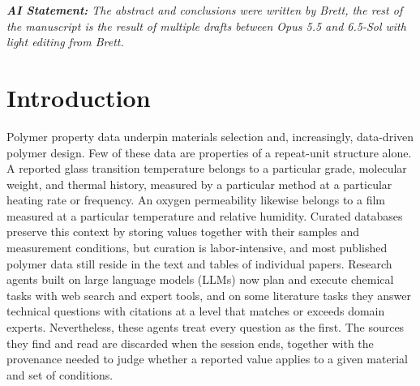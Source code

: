 \documentclass[journal=mamobx,manuscript=article]{achemso}
\begin{document}

{\small\itshape\noindent\textbf{AI Statement:} The abstract and conclusions were written by Brett, the rest of the manuscript is the result of multiple drafts between Opus 5.5 and 6.5-Sol with light editing from Brett.\par}

\section{Introduction}

Polymer property data underpin materials selection and, increasingly, data-driven polymer design.\cite{Audus2017Polymer,Chen2021Polymer}
Few of these data are properties of a repeat-unit structure alone.\cite{Jha2019Uncertainty,Liu2023Ontology}
A reported glass transition temperature belongs to a particular grade, molecular weight, and thermal history, measured by a particular method at a particular heating rate or frequency.\cite{FoxFlory1950Second,Hutchinson2009Glass,Jha2019Uncertainty}
An oxygen permeability likewise belongs to a film measured at a particular temperature and relative humidity.\cite{Muramatsu2003Oxygen,Mokwena2012EVOH}
Curated databases preserve this context by storing values together with their samples and measurement conditions,\cite{Otsuka2011PoLyInfo,Liu2023Ontology} but curation is labor-intensive,\cite{Tchoua2016Blending,Ma2020PI1M} and most published polymer data still reside in the text and tables of individual papers.\cite{Kononova2021TextMining,Shetty2023Pipeline}
Research agents built on large language models (LLMs) now plan and execute chemical tasks with web search and expert tools,\cite{Boiko2023Coscientist,Bran2024ChemCrow} and on some literature tasks they answer technical questions with citations at a level that matches or exceeds domain experts.\cite{Skarlinski2024PaperQA2}
Nevertheless, these agents treat every question as the first.
The sources they find and read are discarded when the session ends, together with the provenance needed to judge whether a reported value applies to a given material and set of conditions.
\end{document}
